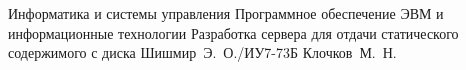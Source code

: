 \documentclass{bmstu}
\begin{document}
\makecourseworktitle
	{Информатика и системы управления}
	{Программное обеспечение ЭВМ и информационные технологии}
	{Разработка сервера для отдачи статического содержимого с диска}
	{Шишмир~Э.~О./ИУ7-73Б}
	{Клочков~М.~Н.} 
	{}{}{}

\setcounter{page}{3}

\setlength{\cftbeforetoctitleskip}{-22pt}
\renewcommand{\cftaftertoctitle}{\hfill}
\renewcommand{\contentsname}{\hfill\LARGE СОДЕРЖАНИЕ\hfill}
\tableofcontents







\makebibliography


\end{document}
